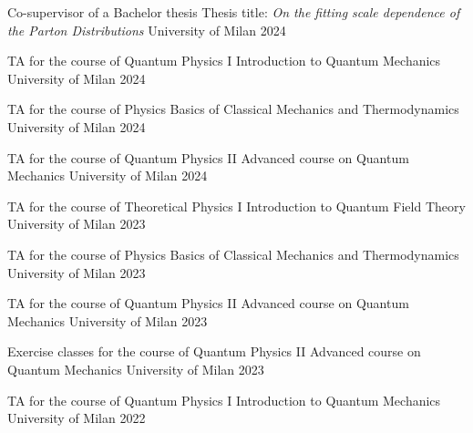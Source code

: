 
\begin{cvhonors}

    \cvhonor
    {Co-supervisor of a Bachelor thesis} %
    {Thesis title: \textit{On the fitting scale dependence of the Parton Distributions}}
    {University of Milan} %
    {2024}

    \cvhonor
    {TA for the course of Quantum Physics I} %
    {Introduction to Quantum Mechanics}
    {University of Milan} %
    {2024}

    \cvhonor
    {TA for the course of Physics} %
    {Basics of Classical Mechanics and Thermodynamics}
    {University of Milan} %
    {2024}

    \cvhonor
    {TA for the course of Quantum Physics II} %
    {Advanced course on Quantum Mechanics}
    {University of Milan} %
    {2024}

    \cvhonor
    {TA for the course of Theoretical Physics I} %
    {Introduction to Quantum Field Theory}
    {University of Milan} %
    {2023}

    \cvhonor
    {TA for the course of Physics} %
    {Basics of Classical Mechanics and Thermodynamics}
    {University of Milan} %
    {2023}

    \cvhonor
    {TA for the course of Quantum Physics II} %
    {Advanced course on Quantum Mechanics}
    {University of Milan} %
    {2023}

    \cvhonor
    {Exercise classes for the course of Quantum Physics II} %
    {Advanced course on Quantum Mechanics}
    {University of Milan} %
    {2023}

    \cvhonor
    {TA for the course of Quantum Physics I} %
    {Introduction to Quantum Mechanics}
    {University of Milan} %
    {2022}

\end{cvhonors}